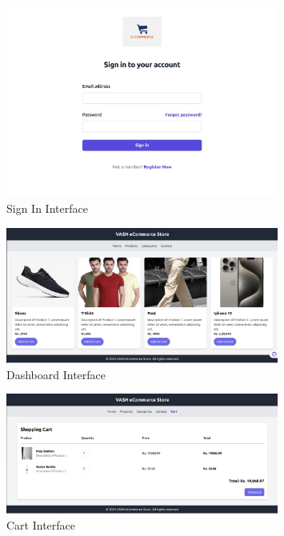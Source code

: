 \documentclass{article}
\begin{document}
\begin{figure}[h!] %
    \centering
    \includegraphics[width=0.8\textwidth]{sign_in.jpg} %
    \caption{Sign In Interface} %
\end{figure}

\vspace{1cm} %

\begin{figure}[h!] %
    \centering
    \includegraphics[width=0.8\textwidth]{dashboard.jpg} %
    \caption{Dashboard Interface} %
\end{figure}

\vspace{1cm} %

\begin{figure}[h!] %
    \centering
    \includegraphics[width=0.8\textwidth]{cart.jpg} %
    \caption{Cart Interface} %
\end{figure}
\end{document}
